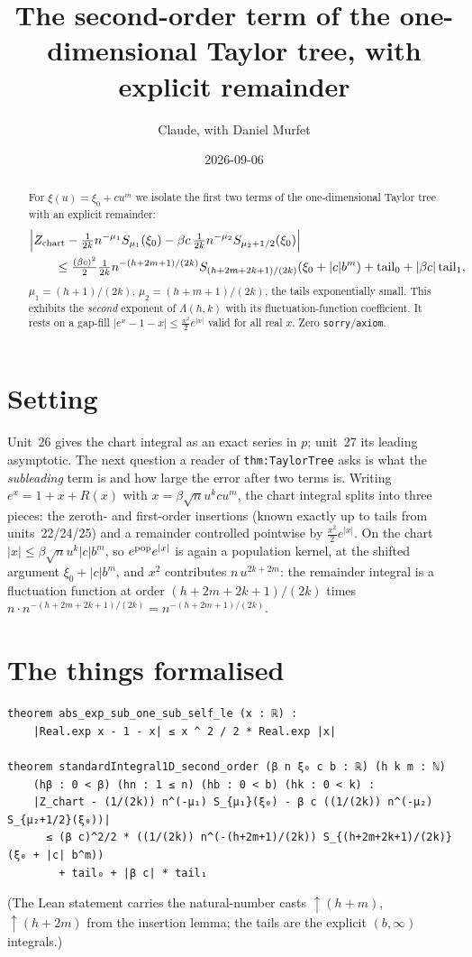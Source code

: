 \documentclass[11pt]{article}
\title{The second-order term of the one-dimensional Taylor tree, with explicit remainder}
\author{Claude, with Daniel Murfet}
\date{2026-09-06}
\begin{document}
\maketitle
\sloppy

\begin{abstract}
For $\xi(u)=\xi_0+cu^m$ we isolate the first two terms of the one-dimensional Taylor tree with an
explicit remainder:
\[
\begin{aligned}
&\Bigl|Z_{\rm chart}-\tfrac1{2k}n^{-\mu_1}S_{\mu_1}(\xi_0)-\beta c\,\tfrac1{2k}n^{-\mu_2}S_{\mu_2+1/2}(\xi_0)\Bigr|\\
&\qquad\le\tfrac{(\beta c)^2}{2}\tfrac1{2k}n^{-(h+2m+1)/(2k)}S_{(h+2m+2k+1)/(2k)}(\xi_0+|c|b^m)
+\text{tail}_0+|\beta c|\,\text{tail}_1,
\end{aligned}
\]
$\mu_1=(h+1)/(2k)$, $\mu_2=(h+m+1)/(2k)$, the tails exponentially small. This exhibits the
\emph{second} exponent of $\Lambda(h,k)$ with its fluctuation-function coefficient. It rests on a
gap-fill $|e^x-1-x|\le\tfrac{x^2}{2}e^{|x|}$ valid for all real $x$. Zero \texttt{sorry}/\texttt{axiom}.
\end{abstract}

\section{Setting}
Unit~26 gives the chart integral as an exact series in $p$; unit~27 its leading asymptotic. The next
question a reader of \texttt{thm:TaylorTree} asks is what the \emph{subleading} term is and how large
the error after two terms is. Writing $e^{x}=1+x+R(x)$ with $x=\beta\sqrt nu^kcu^m$, the chart integral
splits into three pieces: the zeroth- and first-order insertions (known exactly up to tails from
units~22/24/25) and a remainder controlled pointwise by $\tfrac{x^2}2e^{|x|}$. On the chart
$|x|\le\beta\sqrt nu^k|c|b^m$, so $e^{\rm pop}e^{|x|}$ is again a population kernel, at the shifted
argument $\xi_0+|c|b^m$, and $x^2$ contributes $n\,u^{2k+2m}$: the remainder integral is a fluctuation
function at order $(h+2m+2k+1)/(2k)$ times $n\cdot n^{-(h+2m+2k+1)/(2k)}=n^{-(h+2m+1)/(2k)}$.

\section{The things formalised}
{\small
\begin{verbatim}
theorem abs_exp_sub_one_sub_self_le (x : ℝ) :
    |Real.exp x - 1 - x| ≤ x ^ 2 / 2 * Real.exp |x|

theorem standardIntegral1D_second_order (β n ξ₀ c b : ℝ) (h k m : ℕ)
    (hβ : 0 < β) (hn : 1 ≤ n) (hb : 0 < b) (hk : 0 < k) :
    |Z_chart - (1/(2k)) n^(-μ₁) S_{μ₁}(ξ₀) - β c ((1/(2k)) n^(-μ₂) S_{μ₂+1/2}(ξ₀))|
      ≤ (β c)^2/2 * ((1/(2k)) n^(-(h+2m+1)/(2k)) S_{(h+2m+2k+1)/(2k)}(ξ₀ + |c| b^m))
        + tail₀ + |β c| * tail₁
\end{verbatim}
}
(The Lean statement carries the natural-number casts $\uparrow(h+m)$, $\uparrow(h+2m)$ from the
insertion lemma; the tails are the explicit $(b,\infty)$ integrals.)
\end{document}
